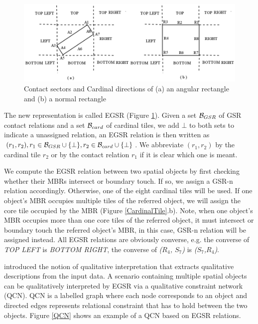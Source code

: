 \documentclass[letterpaper]{article}
\begin{document}
\begin{figure}[t!]
\centering\includegraphics[scale=0.25]{EGSR-relations.png}
\caption{Contact sectors and Cardinal directions of (a) an angular rectangle and (b) a normal rectangle}
\label{EGSR}
\vspace{-3mm}
\end{figure}

The new representation is called EGSR (Figure \ref{EGSR}). Given a set ${\cal B}_{GSR}$ of GSR contact relations and a set ${\cal B}_{card}$ of cardinal tiles,  we add $\bot$ to both sets to indicate a unassigned relation, an EGSR relation is then written as $(r_1, r_2), r_1 \in {\cal B}_{GSR}\cup \{\bot\}, r_2 \in {\cal B}_{card}\cup \{\bot\}$. We abbreviate $(r_1,r_2)$ by the cardinal tile $r_2$ or by the contact relation $r_1$ if it is clear which one is meant. 

We compute the EGSR relation between two spatial objects by first checking whether their MBRs intersect or boundary touch. If so, we assign a GSR-n relation accordingly. Otherwise, one of the eight cardinal tiles will be used. If one object's MBR occupies multiple tiles of the referred object, we will assign the core tile occupied by the MBR (Figure \ref{CardinalTile}.b). Note, when one object's MBR occupies more than one core tiles of the referred object, it must intersect or boundary touch the referred object's MBR, in this case, GSR-n relation will be assigned instead. All EGSR relations are obviously converse, e.g. the converse of \emph{TOP LEFT} is \emph{BOTTOM RIGHT}, the converse of \emph{($R_4$, $S_7$)} is \emph{($S_7$,$R_4$)}.

\cite{wallgrun2010qualitative} introduced the notion of qualitative interpretation that extracts qualitative descriptions from the input data. A scenario containing multiple spatial objects can be qualitatively interpreted by EGSR via a qualitative constraint network (QCN). QCN is a labelled graph where each node corresponds to an object and directed edges represents relational constraint that has to hold between the two objects. 
Figure \ref{QCN} shows an example of a QCN based on EGSR relations.
\end{document}
